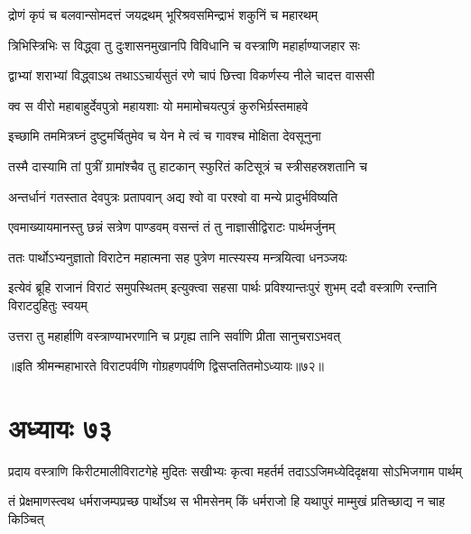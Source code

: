 \twolineshloka
{द्रोणं कृपं च बलवान्सोमदत्तं जयद्रथम्}
{भूरिश्रवसमिन्द्राभं शकुनिं च महारथम्}


\twolineshloka
{त्रिभिस्त्रिभिः स विद्ध्वा तु दुःशासनमुखानपि}
{विविधानि च वस्त्राणि महार्हाण्याजहार सः}


\twolineshloka
{द्वाभ्यां शराभ्यां विद्ध्वाऽथ तथाऽऽचार्यसुतं रणे}
{चापं छित्त्वा विकर्णस्य नीले चादत्त वाससी}




\twolineshloka
{क्व स वीरो महाबाहुर्देवपुत्रो महायशाः}
{यो ममामोचयत्पुत्रं कुरुभिर्ग्रस्तमाहवे}


\twolineshloka
{इच्छामि तममित्रघ्नं दुष्टुमर्चितुमेव च}
{येन मे त्वं च गावश्च मोक्षिता देवसूनुना}


\twolineshloka
{तस्मै दास्यामि तां पुत्रीं ग्रामांश्चैव तु हाटकान्}
{स्फुरितं कटिसूत्रं च स्त्रीसहस्रशतानि च}




\twolineshloka
{अन्तर्धानं गतस्तात देवपुत्रः प्रतापवान्}
{अद्य श्वो वा परश्वो वा मन्ये प्रादुर्भविष्यति}



\twolineshloka
{एवमाख्यायमानस्तु छन्नं सत्रेण पाण्डवम्}
{वसन्तं तं तु नाज्ञासीद्विराटः पार्थमर्जुनम्}


\twolineshloka
{ततः पार्थोऽभ्यनुज्ञातो विराटेन महात्मना}
{सह पुत्रेण मात्स्यस्य मन्त्रयित्वा धनञ्जयः}


\threelineshloka
{इत्येवं ब्रूहि राजानं विराटं समुपस्थितम्}
{इत्युक्त्वा सहसा पार्थः प्रविश्यान्तःपुरं शुभम्}
{ददौ वस्त्राणि रन्तानि विराटदुहितुः स्वयम्}


\twolineshloka
{उत्तरा तु महार्हाणि वस्त्राण्याभरणानि च}
{प्रगृह्य तानि सर्वाणि प्रीता सानुचराऽभवत्}

॥इति श्रीमन्महाभारते विराटपर्वणि गोग्रहणपर्वणि द्विसप्ततितमोऽध्यायः॥७२॥

\chapter{अध्यायः ७३}

\twolineshloka
{प्रदाय वस्त्राणि किरीटमालीविराटगेहे मुदितः सखीभ्यः}
{कृत्वा महर्तर्म तदाऽऽजिमध्येदिदृक्षया सोऽभिजगाम पार्थम्}


\twolineshloka
{तं प्रेक्षमाणस्त्वथ धर्मराजम्पप्रच्छ पार्थोऽथ स भीमसेनम्}
{किं धर्मराजो हि यथापुरं माम्मुखं प्रतिच्छाद्य न चाह किञ्चित्}


